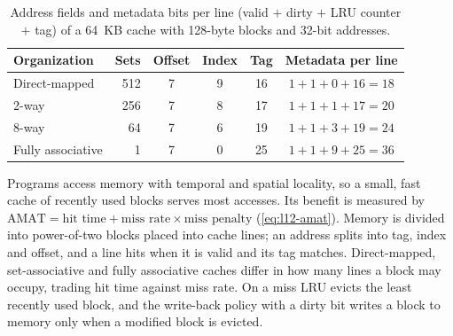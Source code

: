 \documentclass[../main.tex]{subfiles}
\begin{document}
\begin{table}[htbp]
  \centering\small
  \caption{Address fields and metadata bits per line (valid $+$ dirty $+$
    LRU counter $+$ tag) of a 64~KB cache with 128-byte blocks and 32-bit
    addresses.}
  \label{tab:l12-organizations}
  \begin{tabular}{@{}lrcccc@{}}
    \toprule
    Organization & Sets & Offset & Index & Tag & Metadata per line \\
    \midrule
    Direct-mapped     & 512 & 7 & 9 & 16 & $1+1+0+16 = 18$ \\
    2-way             & 256 & 7 & 8 & 17 & $1+1+1+17 = 20$ \\
    8-way             & 64  & 7 & 6 & 19 & $1+1+3+19 = 24$ \\
    Fully associative & 1   & 7 & 0 & 25 & $1+1+9+25 = 36$ \\
    \bottomrule
  \end{tabular}
\end{table}

\begin{keypoint}
  Programs access memory with temporal and spatial locality, so a small, fast
  cache of recently used blocks serves most accesses.  Its benefit is
  measured by $\text{AMAT} = \text{hit time} + \text{miss rate} \times
  \text{miss penalty}$ (\cref{eq:l12-amat}).  Memory is divided into
  power-of-two blocks placed into cache lines; an address splits into tag,
  index and offset, and a line hits when it is valid and its tag matches.
  Direct-mapped, set-associative and fully associative caches differ in how
  many lines a block may occupy, trading hit time against miss rate.  On a
  miss LRU evicts the least recently used block, and the write-back policy
  with a dirty bit writes a block to memory only when a modified block is
  evicted.
\end{keypoint}
\end{document}
